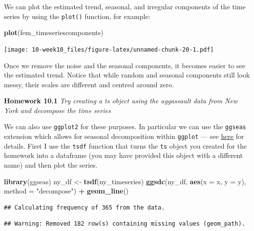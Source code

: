\documentclass[]{book}
\newenvironment{Shaded}{\begin{snugshade}}{\end{snugshade}}
\newcommand{\DataTypeTok}[1]{\textcolor[rgb]{0.13,0.29,0.53}{#1}}
\newcommand{\KeywordTok}[1]{\textcolor[rgb]{0.13,0.29,0.53}{\textbf{#1}}}
\newcommand{\NormalTok}[1]{#1}
\newcommand{\OperatorTok}[1]{\textcolor[rgb]{0.81,0.36,0.00}{\textbf{#1}}}
\newcommand{\StringTok}[1]{\textcolor[rgb]{0.31,0.60,0.02}{#1}}
\begin{document}
We can plot the estimated trend, seasonal, and irregular components of the time series by using the \texttt{plot()} function, for example:

\begin{Shaded}
\begin{Highlighting}[]
\KeywordTok{plot}\NormalTok{(fem_timeseriescomponents)}
\end{Highlighting}
\end{Shaded}

\texttt{[image: 10-week10\_files/figure-latex/unnamed-chunk-20-1.pdf]}

Once we remove the noise and the seasonal components, it becomes easier to see the estimated trend. Notice that while random and seasonal components still look messy, their scales are different and centred around zero.

\textbf{Homework 10.1}
\emph{Try creating a ts object using the aggassault data from New York and decompose the time series}

We can also use \texttt{ggplot2} for these purposes. In particular we can use the \texttt{ggseas} extension which allows for seasonal decomposition within \texttt{ggplot} --- see \href{https://github.com/ellisp/ggseas}{here} for details. First I use the \texttt{tsdf} function that turns the \texttt{ts} object you created for the homework into a dataframe (you may have provided this object with a different name) and then plot the series.

\begin{Shaded}
\begin{Highlighting}[]
\KeywordTok{library}\NormalTok{(ggseas)}
\NormalTok{ny_df <-}\StringTok{ }\KeywordTok{tsdf}\NormalTok{(ny_timeseries)}
\KeywordTok{ggsdc}\NormalTok{(ny_df, }\KeywordTok{aes}\NormalTok{(}\DataTypeTok{x =}\NormalTok{ x, }\DataTypeTok{y =}\NormalTok{ y), }\DataTypeTok{method =} \StringTok{"decompose"}\NormalTok{) }\OperatorTok{+}
\StringTok{   }\KeywordTok{geom_line}\NormalTok{()}
\end{Highlighting}
\end{Shaded}

\begin{verbatim}
## Calculating frequency of 365 from the data.
\end{verbatim}

\begin{verbatim}
## Warning: Removed 182 row(s) containing missing values (geom_path).
\end{verbatim}
\end{document}
